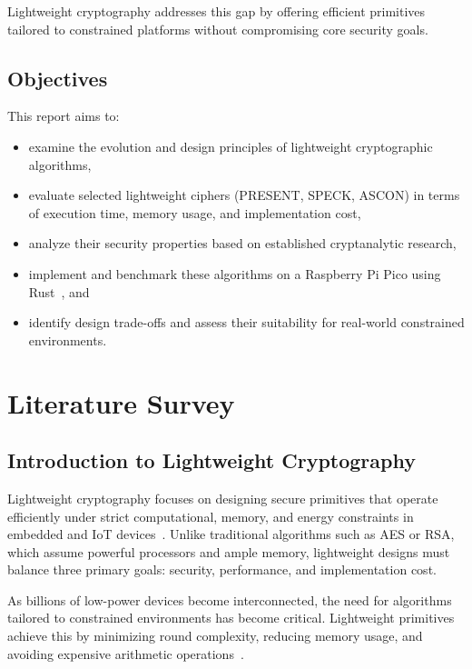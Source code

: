 \documentclass[12pt]{report}
\begin{document}
Lightweight cryptography addresses this gap by offering efficient primitives tailored
to constrained platforms without compromising core security goals.

\section{Objectives}

This report aims to:
\begin{itemize}
    \item examine the evolution and design principles of lightweight cryptographic algorithms,
    \item evaluate selected lightweight ciphers (PRESENT, SPECK, ASCON) in terms of execution time, memory usage, and implementation cost,
    \item analyze their security properties based on established cryptanalytic research,
    \item implement and benchmark these algorithms on a Raspberry Pi Pico using Rust~\cite{rustembedded2022}, and
    \item identify design trade-offs and assess their suitability for real-world constrained environments.
\end{itemize}

\chapter{Literature Survey}

\section{Introduction to Lightweight Cryptography}

Lightweight cryptography focuses on designing secure primitives that operate efficiently
under strict computational, memory, and energy constraints in embedded and IoT
devices~\cite{bogdanov2007present,beaulieu2015simon}. Unlike traditional algorithms such as
AES or RSA, which assume powerful processors and ample memory, lightweight designs must
balance three primary goals: security, performance, and implementation cost.

As billions of low-power devices become interconnected, the need for algorithms tailored to
constrained environments has become critical. Lightweight primitives achieve this by
minimizing round complexity, reducing memory usage, and avoiding expensive arithmetic
operations~\cite{mckay2017nist}.
\end{document}
